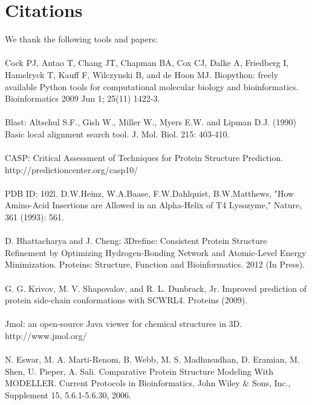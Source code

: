 \documentclass{article}
\begin{document}
\section{Citations}

We thank the following tools and papers: \\\\

Cock PJ, Antao T, Chang JT, Chapman BA, Cox CJ, Dalke A, Friedberg I, Hamelryck T, Kauff F, Wilczynski B, and de Hoon MJ. Biopython: freely available Python tools for computational molecular biology and bioinformatics. Bioinformatics 2009 Jun 1; 25(11) 1422-3.\\\\

Blast:  Altschul S.F., Gish W., Miller W., Myers E.W. and Lipman D.J. (1990)
Basic local alignment search tool.  J. Mol. Biol. 215: 403-410.\\\\

CASP: Critical Assessment of Techniques for Protein Structure Prediction.\\
http://predictioncenter.org/casp10/ \\\\

PDB ID: 102l.
D.W.Heinz, W.A.Baase, F.W.Dahlquist, B.W.Matthews, "How Amino-Acid Insertions are Allowed in an Alpha-Helix of T4 Lysozyme," Nature, 361 (1993): 561.\\\\

D. Bhattacharya and J. Cheng: 3Drefine: Consistent Protein Structure Refinement by Optimizing Hydrogen-Bonding Network and Atomic-Level Energy Minimization.
Proteins: Structure, Function and Bioinformatics. 2012 (In Press).\\\\

G. G. Krivov, M. V. Shapovalov, and R. L. Dunbrack, Jr. Improved prediction of protein side-chain conformations with SCWRL4. Proteins (2009).\\\\

Jmol: an open-source Java viewer for chemical structures in 3D. http://www.jmol.org/ \\\\

N. Eswar, M. A. Marti-Renom, B. Webb, M. S. Madhusudhan, D. Eramian, M. Shen, U. Pieper, A. Sali. Comparative Protein Structure Modeling With MODELLER. Current Protocols in Bioinformatics, John Wiley & Sons, Inc., Supplement 15, 5.6.1-5.6.30, 2006.\\\\
\end{document}
